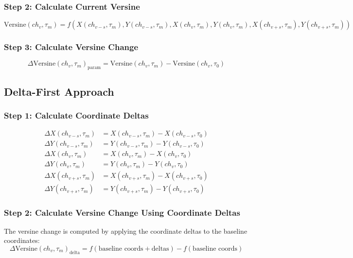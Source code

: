 \documentclass{article}
\begin{document}
\subsubsection{Step 2: Calculate Current Versine}
\begin{equation}
\text{Versine}(ch_v, \tau_m) = f(X(ch_{v-s}, \tau_m), Y(ch_{v-s}, \tau_m), X(ch_v, \tau_m), Y(ch_v, \tau_m), X(ch_{v+s}, \tau_m), Y(ch_{v+s}, \tau_m))
\end{equation}

\subsubsection{Step 3: Calculate Versine Change}
\begin{equation}
\Delta\text{Versine}(ch_v, \tau_m)_{\text{param}} = \text{Versine}(ch_v, \tau_m) - \text{Versine}(ch_v, \tau_0)
\end{equation}

\subsection{Delta-First Approach}

\subsubsection{Step 1: Calculate Coordinate Deltas}
\begin{align}
\Delta X(ch_{v-s}, \tau_m) &= X(ch_{v-s}, \tau_m) - X(ch_{v-s}, \tau_0) \\
\Delta Y(ch_{v-s}, \tau_m) &= Y(ch_{v-s}, \tau_m) - Y(ch_{v-s}, \tau_0) \\
\Delta X(ch_v, \tau_m) &= X(ch_v, \tau_m) - X(ch_v, \tau_0) \\
\Delta Y(ch_v, \tau_m) &= Y(ch_v, \tau_m) - Y(ch_v, \tau_0)
\end{align}
\begin{align}
\Delta X(ch_{v+s}, \tau_m) &= X(ch_{v+s}, \tau_m) - X(ch_{v+s}, \tau_0) \\
\Delta Y(ch_{v+s}, \tau_m) &= Y(ch_{v+s}, \tau_m) - Y(ch_{v+s}, \tau_0)
\end{align}

\subsubsection{Step 2: Calculate Versine Change Using Coordinate Deltas}
The versine change is computed by applying the coordinate deltas to the baseline coordinates:
\begin{equation}
\Delta\text{Versine}(ch_v, \tau_m)_{\text{delta}} = f(\text{baseline coords} + \text{deltas}) - f(\text{baseline coords})
\end{equation}
\end{document}

